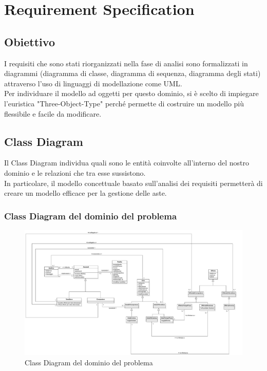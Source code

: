 
\chapter{Requirement Specification}
    \section{Obiettivo}
        I requisiti che sono stati riorganizzati nella fase di analisi sono formalizzati in diagrammi (diagramma di classe, diagramma di sequenza, diagramma degli stati) attraverso l'uso di linguaggi di modellazione come UML. \\
        Per individuare il modello ad oggetti per questo dominio, si è scelto di impiegare l'euristica "Three-Object-Type" perché permette di costruire un modello più flessibile e facile da modificare.

    \section{Class Diagram}
        Il Class Diagram individua quali sono le entità coinvolte all'interno del nostro dominio e le relazioni che tra esse sussistono.\\
        In particolare, il modello concettuale basato sull'analisi dei requisiti permetterà di creare un modello efficace per la gestione delle aste.\\
        \subsection{Class Diagram del dominio del problema}
            \begin{figure}[htbp!]
                \centering
                    \includegraphics[width=1\linewidth]{Immagini/Diagrammi/Class Diagram/ClassDiagramDominio.pdf}
                \caption{Class Diagram del dominio del problema}
                \label{fig:Class Diagram del dominio del problema}
            \end{figure}
            

